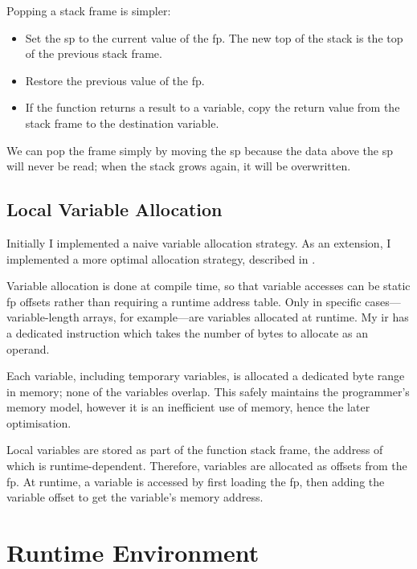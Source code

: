 \documentclass[00-main.tex]{subfiles}
\begin{document}
Popping a stack frame is simpler:

\begin{itemize}[nosep]
\item
Set the \gls{sp} to the current value of the \gls{fp}.
The new top of the stack is the top of the previous stack frame.
\item
Restore the previous value of the \gls{fp}.
\item
If the function returns a result to a variable, copy the return value from the stack frame to the destination variable.
\end{itemize}

We can pop the frame simply by moving the \gls{sp} because the data above the \gls{sp} will never be read; when the stack grows again, it will be overwritten.

\subsection{Local Variable Allocation}\label{sec:impl:local variable allocation}

Initially I implemented a naive variable allocation strategy.
As an extension, I implemented a more optimal allocation strategy, described in .

Variable allocation is done at compile time, so that variable accesses can be static \gls{fp} offsets rather than requiring a runtime address table.
Only in specific cases---variable-length arrays, for example---are variables allocated at runtime.
My \gls{ir} has a dedicated  instruction which takes the number of bytes to allocate as an operand.

Each variable, including temporary variables, is allocated a dedicated byte range in memory; none of the variables overlap.
This safely maintains the programmer's memory model, however it is an inefficient use of memory, hence the later optimisation.

Local variables are stored as part of the function stack frame, the address of which is runtime-dependent.
Therefore, variables are allocated as offsets from the \gls{fp}.
At runtime, a variable is accessed by first loading the \gls{fp}, then adding the variable offset to get the variable's memory address.

\section{Runtime Environment}\label{sec:impl:runtime}
\end{document}
